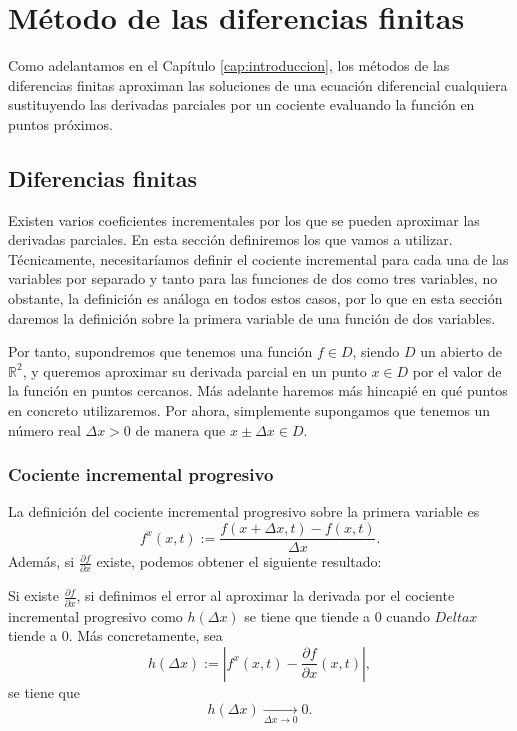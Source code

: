 \chapter{Método de las diferencias finitas}
\label{cap:dif_fin}

Como adelantamos en el Capítulo \ref{cap:introduccion}, los métodos de las diferencias finitas aproximan las soluciones de una ecuación diferencial cualquiera sustituyendo las derivadas parciales por un cociente evaluando la función en puntos próximos.

\section{Diferencias finitas}
Existen varios coeficientes incrementales por los que se pueden aproximar las derivadas parciales. En esta sección definiremos los que vamos a utilizar. Técnicamente, necesitaríamos definir el cociente incremental para cada una de las variables por separado y tanto para las funciones de dos como tres variables, no obstante, la definición es análoga en todos estos casos, por lo que en esta sección daremos la definición sobre la primera variable de una función de dos variables.

Por tanto, supondremos que tenemos una función $f\in D$, siendo $D$ un abierto de $\mathbb{R}^2$, y queremos aproximar su derivada parcial en un punto $x\in D$ por el valor de la función en puntos cercanos. Más adelante haremos más hincapié en qué puntos en concreto utilizaremos. Por ahora, simplemente supongamos que tenemos un número real $\Delta x>0$ de manera que $x\pm \Delta x \in D$.

\subsection{Cociente incremental progresivo}
La definición del cociente incremental progresivo sobre la primera variable es
\begin{equation}
	\label{eq:not_ford}
	f^{x}(x,t) := \frac{f(x+\Delta x,t)-f(x,t)}{\Delta x}.
\end{equation}
Además, si $\frac{\partial f}{\partial x}$ existe, podemos obtener el siguiente resultado:
\begin{lema} \label{lema:error_prog}
	Si existe $\frac{\partial f}{\partial x}$, si definimos el error al aproximar la derivada por el cociente incremental progresivo como $h(\Delta x)$ se tiene que tiende a 0 cuando $Deltax$ tiende a 0. Más concretamente, sea
	\begin{equation}
		h(\Delta x) := \left| f^{x}(x,t) - \frac{\partial f}{\partial x}(x,t) \right|,
	\end{equation}
	se tiene que
	\begin{equation}\label{eq:lemachap2_1}
		h(\Delta x) \xrightarrow[\Delta x\longrightarrow 0]{} 0.
	\end{equation}
\end{lema}

